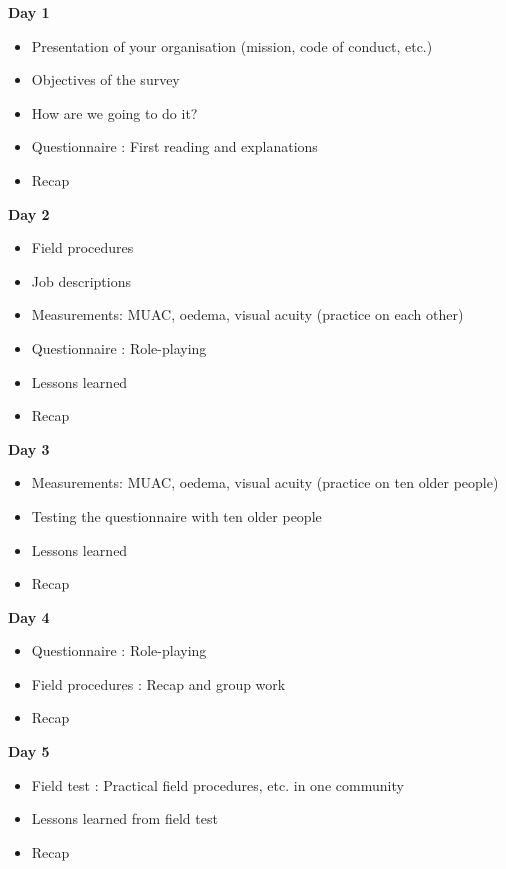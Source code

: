 \documentclass[12pt,a4paper]{book}
\providecommand{\tightlist}{%
  \setlength{\itemsep}{0pt}\setlength{\parskip}{0pt}}
\theoremstyle{definition}
\theoremstyle{definition}
\theoremstyle{definition}
\theoremstyle{remark}
\begin{document}
\textbf{Day 1}

\begin{itemize}
\tightlist
\item
  Presentation of your organisation (mission, code of conduct, etc.)
\item
  Objectives of the survey
\item
  How are we going to do it?
\item
  Questionnaire : First reading and explanations
\item
  Recap
\end{itemize}

\textbf{Day 2}

\begin{itemize}
\tightlist
\item
  Field procedures
\item
  Job descriptions
\item
  Measurements: MUAC, oedema, visual acuity (practice on each other)
\item
  Questionnaire : Role-playing
\item
  Lessons learned
\item
  Recap
\end{itemize}

\textbf{Day 3}

\begin{itemize}
\tightlist
\item
  Measurements: MUAC, oedema, visual acuity (practice on ten older
  people)
\item
  Testing the questionnaire with ten older people
\item
  Lessons learned
\item
  Recap
\end{itemize}

\textbf{Day 4}

\begin{itemize}
\tightlist
\item
  Questionnaire : Role-playing
\item
  Field procedures : Recap and group work
\item
  Recap
\end{itemize}

\textbf{Day 5}

\begin{itemize}
\tightlist
\item
  Field test : Practical field procedures, etc. in one community
\item
  Lessons learned from field test
\item
  Recap
\end{itemize}
\end{document}

